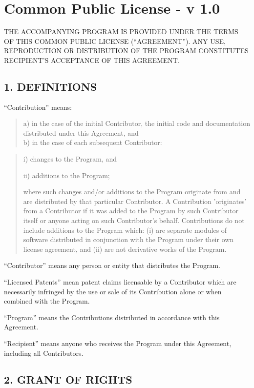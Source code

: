 \chapter{Common Public License - v 1.0}
\label{ref:appendix:license}

THE ACCOMPANYING PROGRAM IS PROVIDED UNDER THE TERMS OF THIS COMMON PUBLIC 
LICENSE (\enquote{AGREEMENT}). ANY USE, REPRODUCTION OR DISTRIBUTION OF THE PROGRAM 
CONSTITUTES RECIPIENT'S ACCEPTANCE OF THIS AGREEMENT.


\section*{1. DEFINITIONS}

\enquote{Contribution} means:

\begin{quote}
a) in the case of the initial Contributor, the initial code and documentation 
distributed under this Agreement, and\\
b) in the case of each subsequent Contributor: 
\end{quote}

\begin{quote}
i) changes to the Program, and 

ii) additions to the Program;

where such changes and/or additions to the Program originate from and are
distributed by that particular Contributor. A Contribution 'originates' from a
Contributor if it was added to the Program by such Contributor itself or anyone
acting on such Contributor's behalf. Contributions do not include additions to
the Program which: (i) are separate modules of software distributed in
conjunction with the Program under their own license agreement, and (ii) are not
derivative works of the Program.
\end{quote}

\enquote{Contributor} means any person or entity that distributes the Program.

\enquote{Licensed Patents} mean patent claims licensable by a Contributor which are 
necessarily infringed by the use or sale of its Contribution alone or when 
combined with the Program.

\enquote{Program} means the Contributions distributed in accordance with this Agreement.

\enquote{Recipient} means anyone who receives the Program under this Agreement, 
including all Contributors.


\section*{2. GRANT OF RIGHTS}


